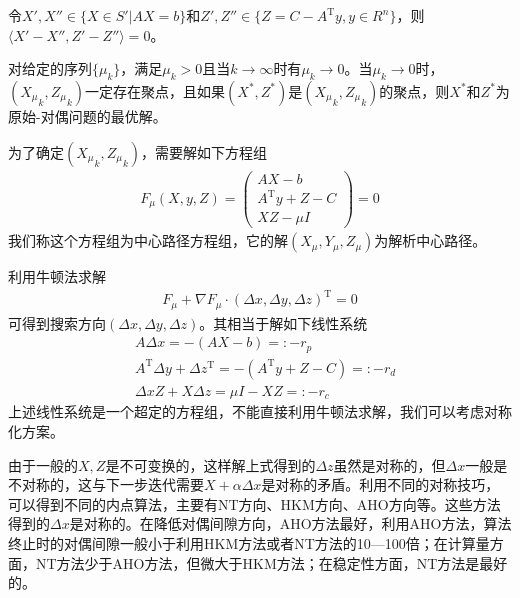         \begin{lemma}
                令$X',X''\in \{X\in S'|AX=b\}$和$Z',Z''\in \{Z=C-A^\mathrm{T} y,y \in R^n\}$，则$\langle{X'-X'',Z'-Z''}\rangle=0$。
        \end{lemma}
        \begin{theorem}
                对给定的序列$\{{\mu}_k\}$，满足${\mu}_k>0$且当$k\to \infty$时有${\mu}_k\to 0$。当${\mu}_k\to 0$时，$({X_{\mu}}_k,{Z_{\mu}}_k)$一定存在聚点，且如果$(X^*,Z^*)$是$({X_{\mu}}_k,{Z_{\mu}}_k)$的聚点，则$X^*$和$Z^*$为原始-对偶问题的最优解。

        \end{theorem}
         \par
        为了确定$({X_{\mu}}_k,{Z_{\mu}}_k)$，需要解如下方程组
        \begin{align*}
          {F}_{\mu}(X,y,Z)=\begin{pmatrix}AX-b\\ A^\mathrm{T} y+Z-C \\XZ-\mu I\end{pmatrix}=0
        \end{align*}
        我们称这个方程组为中心路径方程组，它的解$(X_{\mu},Y_{\mu},Z_{\mu})$为解析中心路径。
        \par
        利用牛顿法求解
        \begin{align*}
          {F}_{\mu}+\nabla {F}_{\mu}\cdot (\Delta x,\Delta y,\Delta z)^\mathrm{T} =0
        \end{align*}
        可得到搜索方向$(\Delta x,\Delta y,\Delta z)$。其相当于解如下线性系统
        \begin{align}
        \label{eq:SDP的线性系统}
          & A \Delta x =-(AX-b)=:-r_p\\
          & A^\mathrm{T} \Delta y+\Delta z^\mathrm{T} =-(A^\mathrm{T} y+Z-C)=:-r_d\\
          & \Delta x Z+X\Delta z=\mu I-XZ=:-r_c
        \end{align}
        上述线性系统是一个超定的方程组，不能直接利用牛顿法求解，我们可以考虑对称化方案。
        \par
        由于一般的$X,Z$是不可变换的，这样解上式得到的$\Delta z$虽然是对称的，但$\Delta x$一般是不对称的，这与下一步迭代需要$X+\alpha \Delta x$是对称的矛盾。利用不同的对称技巧，可以得到不同的内点算法，主要有NT方向、HKM方向、AHO方向等。这些方法得到的$\Delta x$是对称的。在降低对偶间隙方向，AHO方法最好，利用AHO方法，算法终止时的对偶间隙一般小于利用HKM方法或者NT方法的10—100倍；在计算量方面，NT方法少于AHO方法，但微大于HKM方法；在稳定性方面，NT方法是最好的。
